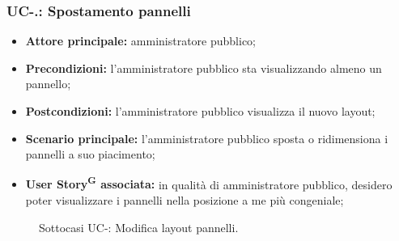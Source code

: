 \documentclass[8pt]{article}
\newcommand{\glossterm}[1]{#1\textsuperscript{G}} %
\begin{document}
\subsubsection*{UC-\theuc .\speconenumber: Spostamento pannelli}
\begin{itemize}
    \item \textbf{Attore principale:} amministratore pubblico;
    \item \textbf{Precondizioni:} l'amministratore pubblico sta visualizzando almeno un pannello;
    \item \textbf{Postcondizioni:} l’amministratore pubblico visualizza il nuovo layout;
    \item \textbf{Scenario principale: }l’amministratore pubblico sposta o ridimensiona i pannelli a
        suo piacimento;
    \item \textbf{\glossterm{User Story} associata:} in qualità di amministratore pubblico, desidero poter
        visualizzare i pannelli nella posizione a me più congeniale;
\end{itemize}
\begin{figure}[ht!]
    \centering
    \caption{Sottocasi UC-\theuc: Modifica layout pannelli.}
    \label{fig:Sottocasi UC-\theuc: Modifica layout pannelli}
\end{figure}
\end{document}
